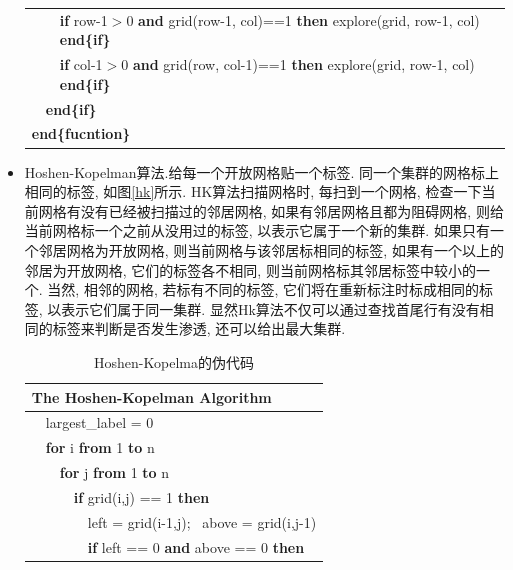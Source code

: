 \documentclass[11pt,a4paper,boxed]{caspset}
\begin{document}
\begin{itemize}
\begin{table}[!htb]
{\begin{tabular}{|lllll}
 &  & \multicolumn{3}{l|}{\textbf{if} \hspace{0.4em}row-1$>$0 \textbf{and} grid(row-1, \hspace{0.3em}col)==1 \textbf{then} explore(grid,  \hspace{0.1em}row-1, \hspace{0.1em}col) \textbf{end\{if\}}} \\
 &  & \multicolumn{3}{l|}{\textbf{if}\hspace{0.9em} col-1$>$0 \textbf{and} grid(row, \hspace{0.4em}col-1)==1 \textbf{then} explore(grid, row-1, \hspace{0.2em}col) \textbf{end\{if\}}} \\
 & \multicolumn{4}{l|}{\textbf{end\{if\}}} \\
\multicolumn{5}{|l|}{\textbf{end\{fucntion\}}} \\
\hline
\end{tabular}}
\end{table}
\item Hoshen-Kopelman算法.给每一个开放网格贴一个标签. 同一个集群的网格标上相同的标签, 如图\ref{hk}所示.
 HK算法扫描网格时, 每扫到一个网格, 检查一下当前网格有没有已经被扫描过的邻居网格, 如果有邻居网格且都为阻碍网格, 则给当前网格标一个之前从没用过的标签, 以表示它属于一个新的集群. 如果只有一个邻居网格为开放网格, 则当前网格与该邻居标相同的标签, 如果有一个以上的邻居为开放网格, 它们的标签各不相同, 则当前网格标其邻居标签中较小的一个. 当然, 相邻的网格, 若标有不同的标签, 它们将在重新标注时标成相同的标签, 以表示它们属于同一集群. 显然Hk算法不仅可以通过查找首尾行有没有相同的标签来判断是否发生渗透, 还可以给出最大集群.
\begin{table}[!htb]
\centering
\caption{Hoshen-Kopelma的伪代码}{\scriptsize
\begin{tabular}{|llllllllll|}
\hline
\multicolumn{10}{|l|}{The Hoshen-Kopelman Algorithm} \\
\hline
 & \multicolumn{9}{l|}{largest\_label = 0} \\
 & \multicolumn{9}{l|}{\textbf{for} i \textbf{from} 1 \textbf{to} n} \\
 &  & \multicolumn{8}{l|}{\textbf{for} j \textbf{from} 1 \textbf{to} n} \\
 &  &  & \multicolumn{7}{l|}{ \textbf{if} grid(i,j) == 1 \textbf{then}} \\
 &  &  &  & \multicolumn{6}{l|}{left = grid(i-1,j); {~}above = grid(i,j-1)} \\
 &  &  &  & \multicolumn{6}{l|}{ \textbf{if} left == 0  \textbf{and} above == 0  \textbf{then}} \\

\end{tabular}}
\end{table}
\end{itemize}
\end{document}
